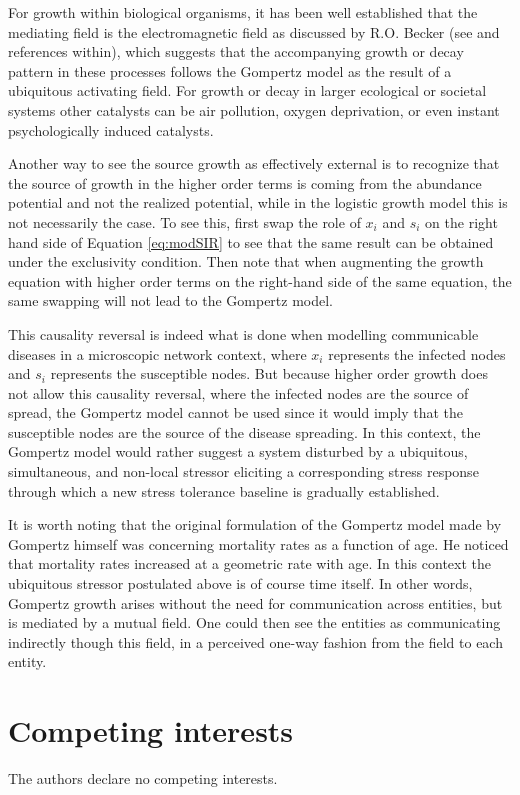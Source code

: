 \documentclass{article}
\begin{document}
For growth within biological organisms, it has been well established that the mediating field is the electromagnetic field as discussed by R.O. Becker (see \citet{becker1984electromagnetic} and references within), which suggests that the accompanying growth or decay pattern in these processes follows the Gompertz model as the result of a ubiquitous activating field. For growth or decay in larger ecological or societal systems other catalysts can be air pollution, oxygen deprivation, or even instant psychologically induced catalysts. 

Another way to see the source growth as effectively external is to recognize that the source of growth in the higher order terms is coming from the abundance potential and not the realized potential, while in the logistic growth model this is not necessarily the case. To see this, first swap the role of $x_i$ and $s_i$ on the right hand side of Equation \ref{eq:modSIR} to see that the same result can be obtained under the exclusivity condition. Then note that when augmenting the growth equation with higher order terms on the right-hand side of the same equation, the same swapping will not lead to the Gompertz model. 

This causality reversal is indeed what is done when modelling communicable diseases in a microscopic network context, where $x_i$ represents the infected nodes and $s_i$ represents the susceptible nodes. But because higher order growth does not allow this causality reversal, where the infected nodes are the source of spread, the Gompertz model cannot be used since it would imply that the susceptible nodes are the source of the disease spreading. In this context, the Gompertz model would rather suggest a system disturbed by a ubiquitous, simultaneous, and non-local stressor eliciting a corresponding stress response through which a new stress tolerance baseline is gradually established.

It is worth noting that the original formulation of the Gompertz model made by Gompertz himself was concerning mortality rates as a function of age. He noticed that mortality rates increased at a geometric rate with age. In this context the ubiquitous stressor postulated above is of course time itself. In other words, Gompertz growth arises without the need for communication across entities, but is mediated by a mutual field. One could then see the entities as communicating indirectly though this field, in a perceived one-way fashion from the field to each entity. 

\section*{Competing interests}
The authors declare no competing interests.
\end{document}
